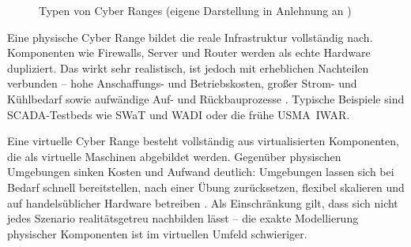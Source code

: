 \begin{figure}[H]
  \centering
  \caption{Typen von Cyber Ranges (eigene Darstellung in Anlehnung an \cite{IntroductionCyberRanges2022})}
  \label{fig:cr-typen}
\end{figure}

Eine physische Cyber Range bildet die reale Infrastruktur vollständig nach. Komponenten
wie Firewalls, Server und Router werden als echte Hardware dupliziert. Das wirkt sehr realistisch, ist jedoch mit erheblichen Nachteilen verbunden -- hohe Anschaffungs- und
Betriebskosten, großer Strom- und Kühlbedarf sowie aufwändige Auf- und Rückbauprozesse
\cite[54]{IntroductionCyberRanges2022}. Typische Beispiele sind SCADA-Testbeds wie SWaT und WADI
oder die frühe USMA~IWAR.

Eine virtuelle Cyber Range besteht vollständig aus virtualisierten Komponenten, die als
virtuelle Maschinen abgebildet werden. Gegenüber physischen Umgebungen sinken Kosten und Aufwand
deutlich: Umgebungen lassen sich bei Bedarf schnell bereitstellen, nach einer Übung zurücksetzen,
flexibel skalieren und auf handelsüblicher Hardware betreiben \cite[60]{IntroductionCyberRanges2022}.
Als Einschränkung gilt, dass sich nicht jedes Szenario realitätsgetreu nachbilden lässt -- die
exakte Modellierung physischer Komponenten ist im virtuellen Umfeld schwieriger. 

